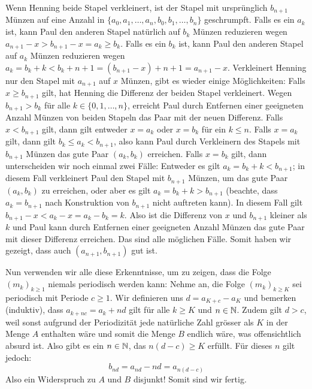 \begin{enumerate}
\begin{itemize}
        \newline
        Wenn Henning beide Stapel verkleinert, ist der Stapel mit ursprünglich $b_{n+1}$ Münzen auf eine Anzahl in $\{ a_0, a_1, \dots , a_n, b_0, b_1, \dots, b_n \}$ geschrumpft. Falls es ein $a_k$ ist, kann Paul den anderen Stapel natürlich auf $b_k$ Münzen reduzieren wegen $a_{n+1}-x > b_{n+1}-x = a_k \geq b_k$.
        Falls es ein $b_k$ ist, kann Paul den anderen Stapel auf $a_k$ Münzen reduzieren wegen $a_k = b_k + k < b_k +n+1 = (b_{n+1}-x) + n+1 = a_{n+1} - x$.
        \newline
        Verkleinert Henning nur den Stapel mit $a_{n+1}$ auf $x$ Münzen, gibt es wieder einige Möglichkeiten:
        \newline 
        Falls $x \geq b_{n+1}$ gilt, hat Henning die Differenz der beiden Stapel verkleinert. Wegen $b_{n+1} > b_k$ für alle $k \in \{0,1, \dots, n \}$, erreicht Paul durch Entfernen einer geeigneten Anzahl Münzen von beiden Stapeln das Paar mit der neuen Differenz.
        \newline
        Falls $x < b_{n+1}$ gilt, dann gilt entweder $x=a_k$ oder $x=b_k$ für ein $k \leq n$. Falls $x=a_k$ gilt, dann gilt $b_k \leq a_k < b_{n+1}$, also kann Paul durch Verkleinern des Stapels mit $b_{n+1}$ Münzen das gute Paar $(a_k,b_k)$ erreichen. Falls $x=b_k$ gilt, dann unterscheiden wir noch einmal zwei Fälle: Entweder es gilt $a_k = b_k + k < b_{n+1}$; in diesem Fall verkleinert Paul den Stapel mit $b_{n+1}$ Münzen, um das gute Paar $(a_k,b_k)$ zu erreichen, oder aber es gilt $a_k = b_k + k > b_{n+1}$ (beachte, dass $a_k = b_{n+1}$ nach Konstruktion von $b_{n+1}$ nicht auftreten kann). In diesem Fall gilt $b_{n+1} - x < a_k - x = a_k - b_k = k$. Also ist die Differenz von $x$ und $b_{n+1}$ kleiner als $k$ und Paul kann durch Entfernen einer geeigneten Anzahl Münzen das gute Paar mit dieser Differenz erreichen.
        \newline
        \newline
        Das sind alle möglichen Fälle. Somit haben wir gezeigt, dass auch $(a_{n+1},b_{n+1})$ gut ist.
    \end{itemize}
    
    Nun verwenden wir alle diese Erkenntnisse, um zu zeigen, dass die Folge $(m_k)_{k\geq 1}$ niemals periodisch werden kann:
    \newline
    Nehme an, die Folge $(m_k)_{k\geq K}$ sei periodisch mit Periode $c \geq 1$. Wir definieren uns $d = a_{K+c}-a_K$ und bemerken (induktiv), dass $a_{k+nc}=a_k + nd$ gilt für alle $k \geq K$ und $n \in \mathbb{N}$. Zudem gilt $d > c$, weil sonst aufgrund der Periodizität jede natürliche Zahl grösser als $K$ in der Menge $A$ enthalten wäre und somit die Menge $B$ endlich wäre, was offensichtlich absurd ist. Also gibt es ein $n \in \mathbb{N}$, das $n(d-c) \geq K$ erfüllt. Für dieses $n$ gilt jedoch:
    \[
    b_{nd} = a_{nd} - nd = a_{n(d-c)}
    \]
    Also ein Widerspruch zu $A$ und $B$ disjunkt! Somit sind wir fertig.
\end{enumerate} 

